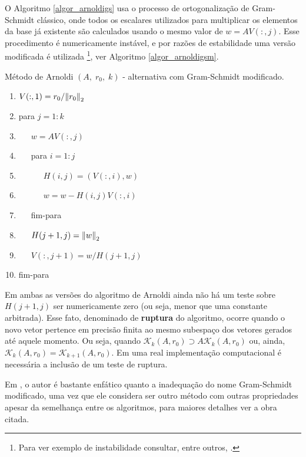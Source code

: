 O Algoritmo \ref{algor_arnoldigs} usa o processo de ortogonalização de Gram-Schmidt clássico, onde todos os escalares  utilizados para multiplicar os elementos da base já  existente são  calculados usando o mesmo valor de $w=AV(:,j)$. Esse procedimento é numericamente instável, e por razões de estabilidade uma versão  modificada é utilizada \cite{Stewart1973Introduction}\footnote{Para ver exemplo de instabilidade consultar, entre outros, \cite[exemplo 5.5.5, pág. 316]{Meyer00Matrix}.}, ver Algoritmo \ref{algor_arnoldigsm}.
     \begin{algor}[htb]
\caption{ Método  de Arnoldi $(A,\;r_0,\;k)$  - alternativa com  Gram-Schmidt modificado.}\label{algor_arnoldigsm}

  {%
\begin{enumerate}
\renewcommand{\labelenumi}{\theenumi:}
\setlength{\itemsep}{.01cm}
\item $V(:,1)=r_0/{\Vert r_0\Vert}_2$
\item para $j=1:k$
\item\label{algor_arnoldigsm_it_wav}~~~$w=AV(:,j)$
\item~~~para $i=1:j$
\item~~~~~~$H(i,j)=(V(:,i),w)$
\item~~~~~~$w=w-H(i,j)V(:,i)$
\item~~~fim-para
\item\label{algor_arnoldigsm_hj1j}~~~$H(j+1,j)={\Vert w\Vert}_2$
\item\label{algor_arnoldigsm_vj1}~~~$V(:,j+1)=w/H(j+1,j)$
\item fim-para
\renewcommand{\labelenumi}{\theenumi.}
\end{enumerate}
}
\end{algor}
\begin{obs}\label{obs_arnoldiruptura}
Em ambas as versões do algoritmo de Arnoldi ainda não há um teste  sobre  $H(j+1,j)$ ser numericamente zero (ou seja, menor que uma constante arbitrada). Esse fato, denominado de \textbf{ruptura} do algoritmo, ocorre quando o novo vetor pertence em precisão finita ao mesmo subespaço dos vetores  gerados  até  aquele momento. Ou seja, quando $\mathcal{K}_k(A,r_0)\supset A\mathcal{K}_k(A,r_0)$ ou, ainda, $\mathcal{K}_k(A,r_0)= \mathcal{K}_{k+1}(A,r_0)$. Em uma real implementação computacional é necessária a inclusão  de um teste de ruptura.
\end{obs}
\begin{obs}\label{obs_mgsgsdif}
Em \cite[pág. 279]{Stewart98Matrix}, o autor é bastante enfático quanto a inadequação do nome Gram-Schmidt modificado, uma vez que ele considera ser outro método com outras propriedades apesar da semelhança entre os algoritmos, para maiores detalhes ver a obra citada.
\end{obs}
